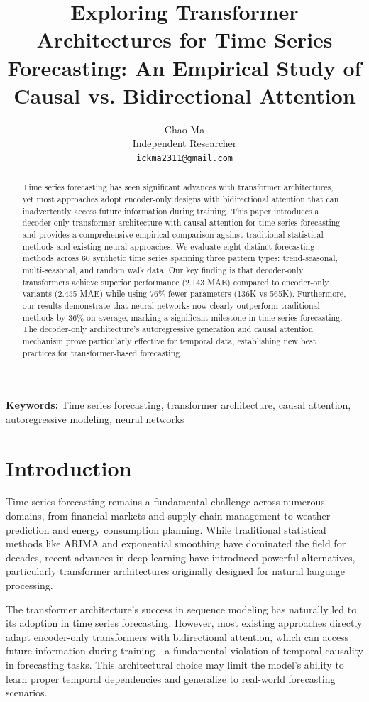 \documentclass[11pt]{article}
\title{Exploring Transformer Architectures for Time Series Forecasting: An Empirical Study of Causal vs. Bidirectional Attention}
\author{Chao Ma\\
Independent Researcher\\
\texttt{ickma2311@gmail.com}
}
\date{}
\begin{document}
\maketitle

\begin{abstract}
Time series forecasting has seen significant advances with transformer architectures, yet most approaches adopt encoder-only designs with bidirectional attention that can inadvertently access future information during training. This paper introduces a decoder-only transformer architecture with causal attention for time series forecasting and provides a comprehensive empirical comparison against traditional statistical methods and existing neural approaches. We evaluate eight distinct forecasting methods across 60 synthetic time series spanning three pattern types: trend-seasonal, multi-seasonal, and random walk data. Our key finding is that decoder-only transformers achieve superior performance (2.143 MAE) compared to encoder-only variants (2.455 MAE) while using 76\% fewer parameters (136K vs 565K). Furthermore, our results demonstrate that neural networks now clearly outperform traditional methods by 36\% on average, marking a significant milestone in time series forecasting. The decoder-only architecture's autoregressive generation and causal attention mechanism prove particularly effective for temporal data, establishing new best practices for transformer-based forecasting.
\end{abstract}

\noindent\textbf{Keywords:} Time series forecasting, transformer architecture, causal attention, autoregressive modeling, neural networks

\section{Introduction}

Time series forecasting remains a fundamental challenge across numerous domains, from financial markets and supply chain management to weather prediction and energy consumption planning. While traditional statistical methods like ARIMA and exponential smoothing have dominated the field for decades, recent advances in deep learning have introduced powerful alternatives, particularly transformer architectures originally designed for natural language processing.

The transformer architecture's success in sequence modeling has naturally led to its adoption in time series forecasting. However, most existing approaches directly adapt encoder-only transformers with bidirectional attention, which can access future information during training—a fundamental violation of temporal causality in forecasting tasks. This architectural choice may limit the model's ability to learn proper temporal dependencies and generalize to real-world forecasting scenarios.
\end{document}
